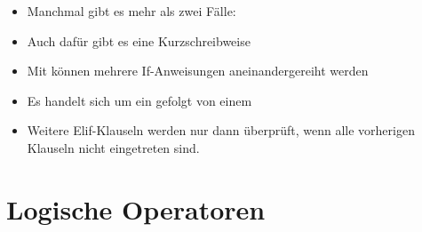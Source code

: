 \begin{frame}
	\slidehead
	\begin{itemize}
		\item Manchmal gibt es mehr als zwei Fälle:
		\item Auch dafür gibt es eine Kurzschreibweise
	\end{itemize}
\end{frame}

\begin{frame}
	\slidehead

	\begin{itemize}
		\item Mit  können mehrere If-Anweisungen aneinandergereiht werden
		\item Es handelt sich um ein  gefolgt von einem 
		\item Weitere Elif-Klauseln werden nur dann überprüft, wenn alle vorherigen Klauseln nicht eingetreten sind.
	\end{itemize}
\end{frame}

\livecoding


\section{Logische Operatoren}


